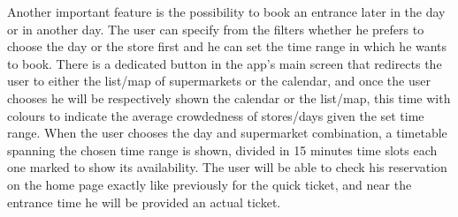 Another important feature is the possibility to book an entrance later in the day or in another day. The user can specify from the filters whether he prefers to choose the day or the store first and he can set the time range in which he wants to book. 
There is a dedicated button in the app’s main screen that redirects the user to either the list/map of supermarkets or the calendar, and once the user chooses he will be respectively shown the calendar or the list/map, this time with colours to indicate the average crowdedness of stores/days given the set time range.
When the user chooses the day and supermarket combination, a timetable spanning the chosen time range is shown, divided in 15 minutes time slots each one marked to show its availability. The user will be able to check his reservation on the home page exactly like previously for the quick ticket, and near the entrance time he will be provided an actual ticket.\\
